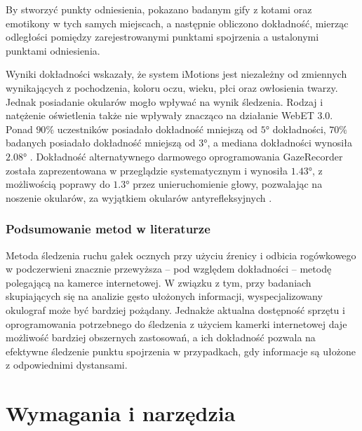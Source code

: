 \documentclass[a4paper,twoside,12pt]{book}
\begin{document}
By stworzyć punkty odniesienia, pokazano badanym gify z kotami oraz emotikony w tych samych miejscach, a następnie obliczono dokładność, mierząc odległości pomiędzy zarejestrowanymi punktami spojrzenia a ustalonymi punktami odniesienia.

Wyniki dokładności wskazały, że system iMotions jest niezależny od zmiennych wynikających z pochodzenia, koloru oczu, wieku, płci oraz owłosienia twarzy. Jednak posiadanie okularów mogło wpływać na wynik śledzenia. Rodzaj i natężenie oświetlenia także nie wpływały znacząco na działanie WebET 3.0. Ponad $90\%$ uczestników posiadało dokładność mniejszą od $\ang{5}$ dokładności, $70\%$ badanych posiadało dokładność mniejszą od $\ang{3}$, a mediana dokładności wynosiła $\ang{2.08}$ \cite{bib:iMotions-WebET}. Dokładność alternatywnego darmowego oprogramowania GazeRecorder została zaprezentowana w przeglądzie systematycznym i wynosiła $\ang{1,43}$, z możliwością poprawy do $\ang{1,3}$ przez unieruchomienie głowy, pozwalając na noszenie okularów, za wyjątkiem okularów antyrefleksyjnych \cite{bib:GazeRecorder-Review}. 

\subsection{Podsumowanie metod w literaturze}
\label{subsec:Podsumowanie-metod-w-literaturze}

Metoda śledzenia ruchu gałek ocznych przy użyciu źrenicy i odbicia rogówkowego w podczerwieni znacznie przewyższa -- pod względem dokładności -- metodę polegającą na kamerce internetowej. W związku z tym, przy badaniach skupiających się na analizie gęsto ułożonych informacji, wyspecjalizowany okulograf może być bardziej pożądany. Jednakże aktualna dostępność sprzętu i oprogramowania potrzebnego do śledzenia z użyciem kamerki internetowej daje możliwość bardziej obszernych zastosowań, a ich dokładność pozwala na efektywne śledzenie punktu spojrzenia w przypadkach, gdy informacje są ułożone z odpowiednimi dystansami.











%
%
%
\chapter{Wymagania i narzędzia}
\label{ch:wymagania-i-narzedzia}
\end{document}
